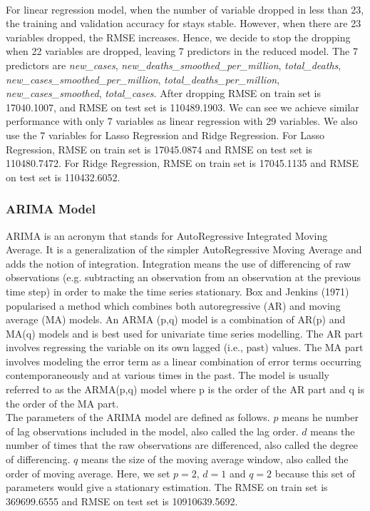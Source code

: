 \documentclass{article}
\begin{document}
\\
\noindent For linear regression model, when the number of variable dropped in less than 23, the training and validation accuracy for stays stable. However, when there are 23 variables dropped, the RMSE increases. Hence, we decide to stop the dropping when 22 variables are dropped, leaving 7 predictors in the reduced model. The 7 predictors are \textit{new\_cases}, \textit{new\_deaths\_smoothed\_per\_million}, \textit{total\_deaths}, \textit{new\_cases\_smoothed\_per\_million}, \textit{total\_deaths\_per\_million}, \textit{new\_cases\_smoothed}, \textit{total\_cases}. After dropping RMSE on train set is  17040.1007, and RMSE on test set is 110489.1903. We can see we achieve similar performance with only 7 variables as linear regression with 29 variables. We also use the 7 variables for Lasso Regression and Ridge Regression. For Lasso Regression, RMSE on train set is  17045.0874 and RMSE on test set is  110480.7472. For Ridge Regression, RMSE on train set is 17045.1135 and RMSE on test set is  110432.6052.

\subsubsection{ARIMA Model}

ARIMA is an acronym that stands for AutoRegressive Integrated Moving Average. It is a generalization of the simpler AutoRegressive Moving Average and adds the notion of integration. Integration means the use of differencing of raw observations (e.g. subtracting an observation from an observation at the previous time step) in order to make the time series stationary. Box and Jenkins (1971)\cite{ARIMA} popularised a method which combines both autoregressive (AR) and moving average (MA) models. An ARMA (p,q) model is a combination of AR(p) and MA(q) models and is best used for univariate time series modelling.  The AR part involves regressing the variable on its own lagged (i.e., past) values. The MA part involves modeling the error term as a linear combination of error terms occurring contemporaneously and at various times in the past. The model is usually referred to as the ARMA(p,q) model where p is the order of the AR part and q is the order of the MA part. \\


\noindent The parameters of the ARIMA model are defined as follows. $p$ means he number of lag observations included in the model, also called the lag order. $d$ means the number of times that the raw observations are differenced, also called the degree of differencing. $q$ means the size of the moving average window, also called the order of moving average. Here, we set $p=2$, $d=1$ and $q=2$ because this set of parameters would give a stationary estimation. The RMSE on train set is 369699.6555 and RMSE on test set is 10910639.5692.
\end{document}
